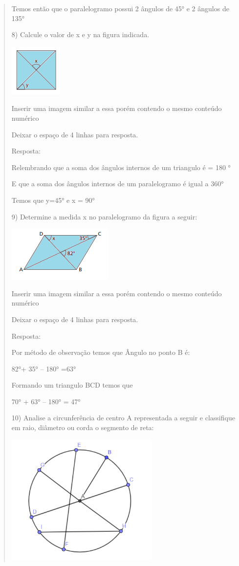 \begin{quote}
\begin{escolha}
Temos então que o paralelogramo possui 2 ângulos de 45° e 2 ângulos de
135°

8) Calcule o valor de x e y na figura indicada.

\includegraphics[width=1.03125in,height=1.03125in]{./imgSAEB_8_MAT/media/image10.png}

Inserir uma imagem similar a essa porém contendo o mesmo conteúdo
numérico

Deixar o espaço de 4 linhas para resposta.

Resposta:

Relembrando que a soma dos ângulos internos de um triangulo é = 180 °

E que a soma dos ângulos internos de um paralelogramo é igual a 360°

Temos que y=45° e x = 90°

9) Determine a medida x no paralelogramo da figura a seguir:

\includegraphics[width=2.05208in,height=1.09375in]{./imgSAEB_8_MAT/media/image11.png}

Inserir uma imagem similar a essa porém contendo o mesmo conteúdo
numérico

Deixar o espaço de 4 linhas para resposta.

Resposta:

Por método de observação temos que Ângulo no ponto B é:

82°+ 35° -- 180° =63°

Formando um triangulo BCD temos que

70° + 63° -- 180° = 47°

10) Analise a circunferência de centro A representada a seguir e
classifique em raio, diâmetro ou corda o segmento de reta:

\includegraphics[width=2.98681in,height=2.57292in]{./imgSAEB_8_MAT/media/image12.png}


\end{escolha}
\end{quote}

